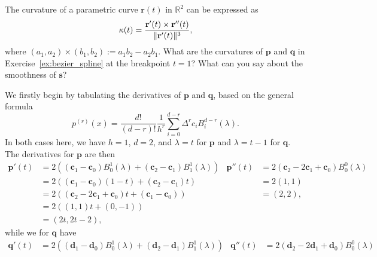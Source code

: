 \begin{exercise}
    The curvature of a parametric curve $\mathbf{r}(t)$ in $\mathbb{R}^2$ can be expressed as
    \begin{equation*}
        \kappa(t) = \frac{\mathbf{r}'(t) \times \mathbf{r}''(t)}{\lVert\mathbf{r}'(t)\rVert^3},
    \end{equation*}
    where $(a_1, a_2) \times (b_1, b_2) := a_1 b_2 - a_2 b_1$.
    What are the curvatures of $\mathbf{p}$ and $\mathbf{q}$ in Exercise~\ref{ex:bezier_spline} at the breakpoint $t = 1$?
    What can you say about the smoothness of $\mathbf{s}$?
\end{exercise}

\begin{solution}
    We firstly begin by tabulating the derivatives of $\mathbf{p}$ and $\mathbf{q}$, based on the general formula
    \begin{equation*}
        p^{(r)}(x) = \frac{d!}{(d - r)!} \frac{1}{h^r} \sum_{i=0}^{d-r} \Delta^r c_{i} B_i^{d-r}(\lambda).
    \end{equation*}
    In both cases here, we have $h = 1$, $d = 2$, and $\lambda = t$ for $\mathbf{p}$ and $\lambda = t - 1$ for $\mathbf{q}$.
    The derivatives for $\mathbf{p}$ are then
    \begin{align*}
        \mathbf{p}'(t) &= 2 \left(\left( \mathbf{c}_1 - \mathbf{c}_0 \right) B_0^1(\lambda) + \left( \mathbf{c}_2 - \mathbf{c}_1 \right) B_1^1(\lambda)\right) &
        \mathbf{p}''(t) &= 2 \left( \mathbf{c}_2 - 2 \mathbf{c}_1 + \mathbf{c}_0 \right) B_0^0(\lambda) \\
        &= 2 \left(\left( \mathbf{c}_1 - \mathbf{c}_0 \right) (1 - t) + \left( \mathbf{c}_2 - \mathbf{c}_1 \right) t\right) &
        &= 2 \left(1, 1\right) \\
        &= 2 \left(
            (\mathbf{c}_2 - 2 \mathbf{c}_1 + \mathbf{c}_0)t + (\mathbf{c}_1 - \mathbf{c}_0)
        \right) &
        &= (2, 2), \\
        &= 2 \left(
            (1, 1)t + (0, -1)
        \right) \\
        &= (2t, 2t - 2),
    \end{align*}
    while we for $\mathbf{q}$ have
    \begin{align*}
        \mathbf{q}'(t) &= 2 \left(\left( \mathbf{d}_1 - \mathbf{d}_0 \right) B_0^1(\lambda) + \left( \mathbf{d}_2 - \mathbf{d}_1 \right) B_1^1(\lambda)\right) &
        \mathbf{q}''(t) &= 2 \left( \mathbf{d}_2 - 2 \mathbf{d}_1 + \mathbf{d}_0 \right) B_0^0(\lambda) \\

\end{align*}
\end{solution}
